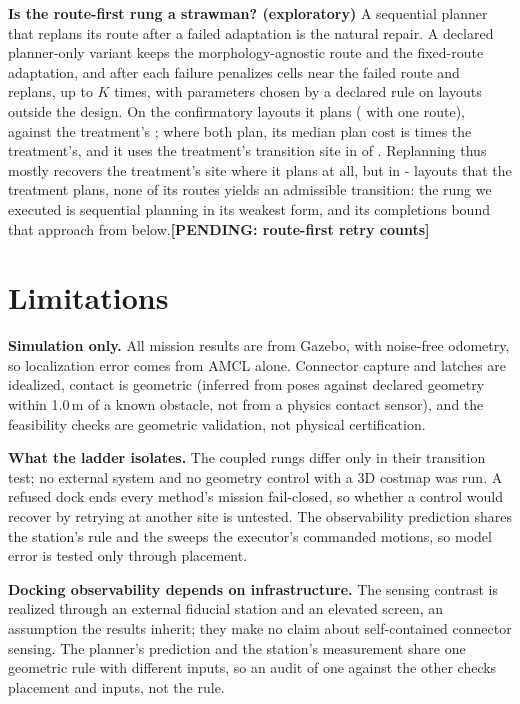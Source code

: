 \documentclass[conference]{IEEEtran}
\newcommand{\pending}[1]{\textbf{[PENDING: #1]}}
\newcommand{\withretry}[2]{\ifdefined\retryLayouts #1\else #2\fi}
\begin{document}
\textbf{Is the route-first rung a strawman? (exploratory)} A sequential planner that replans its route after a failed adaptation is the natural repair. A declared planner-only variant keeps the morphology-agnostic route and the fixed-route adaptation, and after each failure penalizes cells near the failed route and replans, up to \withretry{\retryK}{$K$} times, with parameters chosen by a declared rule on layouts outside the design. \withretry{On the \retryLayouts{} confirmatory layouts it plans \retryPlannedK{} (\retryPlannedOne{} with one route), against the treatment's \retryTreatPlanned; where both plan, its median plan cost is \retryCostMedian{} times the treatment's, and it uses the treatment's transition site in \retrySameSite{} of \retryBoth. Replanning thus mostly recovers the treatment's site where it plans at all, but in \the\numexpr\retryTreatPlanned-\retryBoth\relax{} layouts that the treatment plans, none of its \retryK{} routes yields an admissible transition: the rung we executed is sequential planning in its weakest form, and its completions bound that approach from below.}{\pending{route-first retry counts}}

\section{Limitations}
\label{sec:limitations}

\textbf{Simulation only.} All mission results are from Gazebo, with noise-free odometry, so localization error comes from AMCL alone. Connector capture and latches are idealized, contact is geometric (inferred from poses against declared geometry within 1.0\,m of a known obstacle, not from a physics contact sensor), and the feasibility checks are geometric validation, not physical certification.

\textbf{What the ladder isolates.} The coupled rungs differ only in their transition test; no external system and no geometry control with a 3D costmap was run. A refused dock ends every method's mission fail-closed, so whether a control would recover by retrying at another site is untested. The observability prediction shares the station's rule and the sweeps the executor's commanded motions, so model error is tested only through placement.

\textbf{Docking observability depends on infrastructure.} The sensing contrast is realized through an external fiducial station and an elevated screen, an assumption the results inherit; they make no claim about self-contained connector sensing. The planner's prediction and the station's measurement share one geometric rule with different inputs, so an audit of one against the other checks placement and inputs, not the rule.
\end{document}
